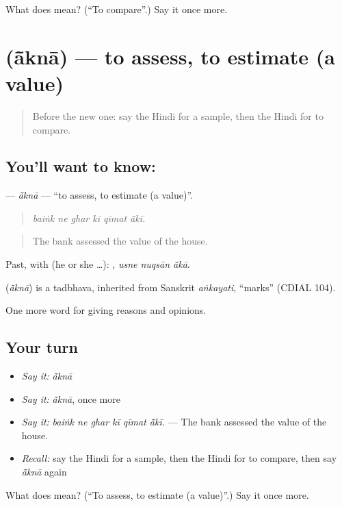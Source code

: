 \begin{tcolorbox}[breakable,colback=teal!4,colframe=teal!35!black,title={Before you move on}]
What does   mean? (\textquotedblleft{}To compare\textquotedblright{}.) Say it once more.
\end{tcolorbox}
\section[\texorpdfstring{\hi{आँकना} (ā̃knā)}{आँकना (ā̃knā)}]{ (ā̃knā) — to assess, to estimate (a value)}

\label{lesson:HI-C363-akna}



\begin{quote}
Before the new one: say the Hindi for a sample, then the Hindi for to compare.
\end{quote}

\subsection*{You'll want to know: }
\textbf{} — \emph{ā̃knā} — \textquotedblleft{}to assess, to estimate (a value)\textquotedblright{}.

\begin{quote}
     
\end{quote}

\begin{quote}
\emph{baiṅk ne ghar kī qīmat ā̃kī.}
\end{quote}

\begin{quote}
The bank assessed the value of the house.
\end{quote}

Past, with  (he or she …):   , \emph{usne nuqsān ā̃kā}.

\begin{cousinweb}
\textbf{} (\emph{ā̃knā}) is a tadbhava, inherited from Sanskrit \emph{aṅkayati}, \textquotedblleft{}marks\textquotedblright{} (CDIAL 104).
\end{cousinweb}

\begin{grammarlens}[title={What you've built}]
One more word for giving reasons and opinions.
\end{grammarlens}

\subsection*{Your turn}
\begin{itemize}
\raggedright
  \item \emph{Say it:} \emph{ā̃knā}
  \item \emph{Say it:} \emph{ā̃knā}, once more
  \item \emph{Say it:} \emph{baiṅk ne ghar kī qīmat ā̃kī.} — The bank assessed the value of the house.
  \item \emph{Recall:} say the Hindi for a sample, then the Hindi for to compare, then say \emph{ā̃knā} again
\end{itemize}

\begin{tcolorbox}[breakable,colback=teal!4,colframe=teal!35!black,title={Before you move on}]
What does  mean? (\textquotedblleft{}To assess, to estimate (a value)\textquotedblright{}.) Say it once more.
\end{tcolorbox}
